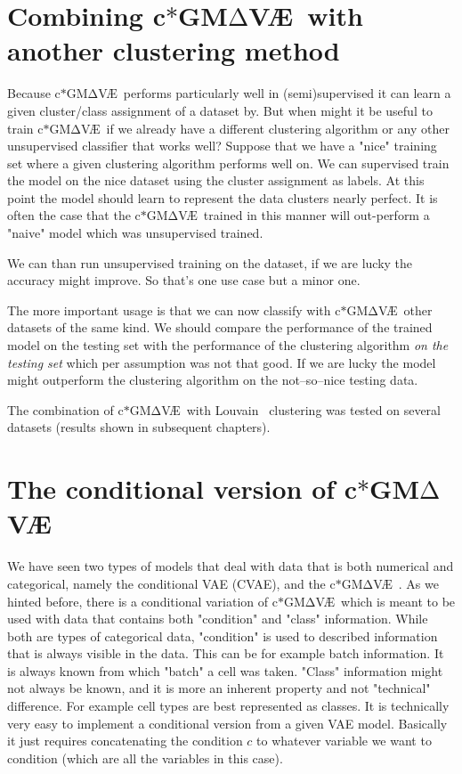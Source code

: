 \documentclass[11pt, a4paper]{report}
\theoremstyle{plain}
\theoremstyle{definition}
\theoremstyle{remark}
\newcommand{\gmvae}{c$\ast$GM$\mathrm{\Delta}$V\AE~}
\begin{document}
\section{Combining \gmvae with another clustering method}

Because \gmvae performs particularly well in (semi)supervised 
it can learn a given cluster/class assignment of a dataset by.
But when might it be useful to train \gmvae if we already have a different
clustering algorithm or any other unsupervised classifier that works well?
Suppose that we have a "nice" training set where a given clustering algorithm
performs well on.
We can supervised train the model on the nice dataset using the cluster assignment
as labels. At this point the model should learn to represent the data clusters
nearly perfect.
It is often the case that the \gmvae trained in this manner will out-perform 
a "naive" model which was unsupervised trained.

We can than run unsupervised training on the dataset, if we are
lucky the accuracy might improve. So that's one use case but a minor one.

The more important usage is that we can now classify with \gmvae other datasets
of the same kind.
We should compare the performance of the trained model on the testing set with
the performance of the clustering algorithm \emph{on the testing set} which per
assumption was not that good. If we are lucky the model might outperform the
clustering algorithm on the not--so--nice testing data.

The combination of \gmvae with Louvain~\cite{que2015scalable} clustering
was tested on several datasets (results shown in subsequent chapters).


\section{The conditional version of \gmvae}

We have seen two types of models that deal with data that is both numerical and
categorical, namely the conditional VAE (CVAE), and the \gmvae.
As we hinted before, there is a conditional variation of \gmvae which
is meant to be used with data that contains both "condition" and "class"
information. While both are types of categorical data, "condition" is used to
described information that is always visible in the data. This can be for
example batch information. It is always known from which "batch" a cell was
taken. "Class" information might not always be known, and it is more an inherent
property and not "technical" difference. For example cell types are best
represented as classes.
It is technically very easy to implement a conditional version from a 
given VAE model. Basically it just requires 
concatenating the condition $c$ to whatever variable we want to condition
(which are all the variables in this case).
\end{document}
